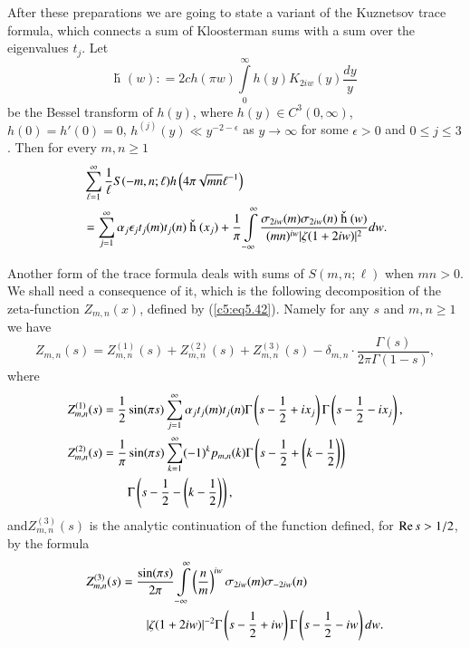 After these preparations we are going to state a variant of the
Kuznet\-sov trace formula, which connects a sum of Kloosterman sums with
a sum over the eigenvalues $t_j$. Let 
\begin{equation}
\text{\v h }(w) : = 2 ch (\pi w) \int\limits^\infty_0 h(y) K_{2iw} (y)
\frac{dy}{y}\label{c5:eq5.63} 
\end{equation}
be the Bessel transform of $h(y)$, where $h(y) \in C^3(0,\infty)$,
$h(0) = h'(0) = 0$, $h^{(j)} (y) \ll y^{-2-\epsilon}$ as $y \to
\infty$ for some $\epsilon  >0$ and $0 \leq j \leq 3$. Then for every
$m,n \geq 1$ 
\begin{align}
& \sum\limits^\infty_{\ell =1} \frac{1}{\ell} S(-m, n ;\ell) h\left(4\pi
\sqrt{mn} \ell^{-1}\right)\label{c5:eq5.64}\\
 & = \sum\limits^\infty_{j=1} \alpha_j \epsilon_j t_j(m) t_j (n)
\text{ \v h }(x_j) + \frac{1}{\pi} \int\limits^{\infty}_{-\infty}
\frac{\sigma_{2iw} (m) \sigma_{2iw} (n) \text{ \v h } (w)}{(mn)^{iw}
  |\zeta(1+2 i w)|^2} dw.\notag 
\end{align}

Another form of the trace formula deals with sums of $S(m,n;\ell)$
when $mn>0$. We shall need a consequence of it, which is the following
decomposition of the zeta-function $Z_{m,n} (x)$, defined by
(\ref{c5:eq5.42}). Namely for any $s$ and $m,n \geq 1$ we have 
\begin{equation}
Z_{m,n} (s)  = Z^{(1)}_{m,n} (s) + Z^{(2)}_{m,n} (s) + Z^{(3)}_{m,n}
(s) - \delta_{m,n} \cdot \frac{\Gamma(s)}{2\pi \Gamma (1-s)},
\label{c5:eq5.65} 
\end{equation}
where 
{\fontsize{10pt}{12pt}\selectfont
\begin{align}
Z^{(1)}_{m,n} (s) & = \frac{1}{2} \sin (\pi s)
\sum\limits^\infty_{j=1} \alpha_j t_j (m) t_j (n) \Gamma \left(s -
\frac{1}{2} + i x_j \right) \Gamma \left(s - \frac{1}{2} - ix_j
\right), \label{c5:eq5.66}\\ 
Z^{(2)}_{m,n} (s) & = \frac{1}{\pi} \sin (\pi s)
\sum\limits^\infty_{k=1}  (-1)^k p_{m,n} (k) \Gamma
\left(s-\frac{1}{2} + \left(k-\frac{1}{2} \right) \right)\notag\\ 
& \qquad \Gamma \left(s - \frac{1}{2} - \left(k-\frac{1}{2} \right)
\right),\label{c5:eq5.67}
\end{align}}
and\pageoriginale $Z^{(3)}_{m,n} (s)$ is the analytic continuation of
the function defined, for $\re\break s > 1/2$, by the formula 
\begin{align}
Z^{(3)}_{m,n} (s) & = \frac{\sin (\pi s)}{2\pi}
\int\limits^{\infty}_{-\infty} \left(\frac{n}{m} \right)^{iw}
\sigma_{2iw}(m) \sigma_{-2iw} (n)\label{c5:eq5.68}\\ 
& \qquad |\zeta (1+2 iw)|^{-2} \Gamma \left(s - \frac{1}{2}+ iw
\right) \Gamma  \left(s-\frac{1}{2} - iw \right) dw.\notag 
\end{align}


